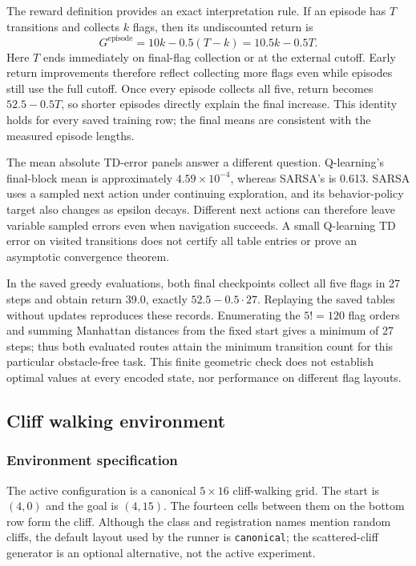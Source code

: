 \documentclass[11pt,a4paper]{article}
\theoremstyle{definition}
\theoremstyle{plain}
\theoremstyle{remark}
\newcommand{\code}[1]{\texttt{#1}}
\begin{document}
The reward definition provides an exact interpretation rule. If an episode has $T$ transitions and collects $k$ flags, then its undiscounted return is
\begin{equation}
 G^{\mathrm{episode}}=10k-0.5(T-k)=10.5k-0.5T.
 \label{eq:flag-return}
\end{equation}
Here $T$ ends immediately on final-flag collection or at the external cutoff. Early return improvements therefore reflect collecting more flags even while episodes still use the full cutoff. Once every episode collects all five, return becomes $52.5-0.5T$, so shorter episodes directly explain the final increase. This identity holds for every saved training row; the final means are consistent with the measured episode lengths.

The mean absolute TD-error panels answer a different question. Q-learning's final-block mean is approximately $4.59\times10^{-4}$, whereas SARSA's is 0.613. SARSA uses a sampled next action under continuing exploration, and its behavior-policy target also changes as epsilon decays. Different next actions can therefore leave variable sampled errors even when navigation succeeds. A small Q-learning TD error on visited transitions does not certify all table entries or prove an asymptotic convergence theorem.

In the saved greedy evaluations, both final checkpoints collect all five flags in 27 steps and obtain return 39.0, exactly $52.5-0.5\cdot27$. Replaying the saved tables without updates reproduces these records. Enumerating the $5!=120$ flag orders and summing Manhattan distances from the fixed start gives a minimum of 27 steps; thus both evaluated routes attain the minimum transition count for this particular obstacle-free task. This finite geometric check does not establish optimal values at every encoded state, nor performance on different flag layouts.
\FloatBarrier

\subsection{Cliff walking environment}
\label{sec:cliff}

\subsubsection{Environment specification}

The active configuration is a canonical $5\times16$ cliff-walking grid. The start is $(4,0)$ and the goal is $(4,15)$. The fourteen cells between them on the bottom row form the cliff. Although the class and registration names mention random cliffs, the default layout used by the runner is \code{canonical}; the scattered-cliff generator is an optional alternative, not the active experiment.
\end{document}
